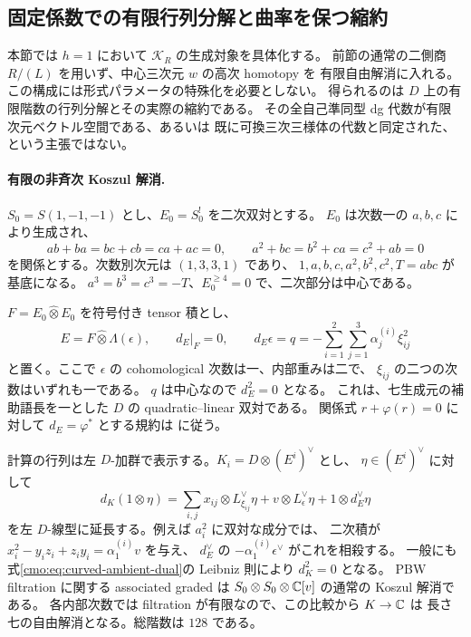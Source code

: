 \subsection{固定係数での有限行列分解と曲率を保つ縮約}
\label{cmo:subsec:curved-invariant-model}

本節では $h=1$ において $\mathcal K_R$ の生成対象を具体化する。
前節の通常の二側商 $R/(L)$ を用いず、中心三次元 $w$ の高次 homotopy を
有限自由解消に入れる。この構成には形式パラメータの特殊化を必要としない。
得られるのは $D$ 上の有限階数の行列分解とその実際の縮約である。
その全自己準同型 dg 代数が有限次元ベクトル空間である、あるいは
既に可換三次三様体の代数と同定された、という主張ではない。

\paragraph{有限の非斉次 Koszul 解消.}
$S_0=S(1,-1,-1)$ とし、$E_0=S_0^!$ を二次双対とする。
$E_0$ は次数一の $a,b,c$ により生成され、
\[
 ab+ba=bc+cb=ca+ac=0,\qquad
 a^2+bc=b^2+ca=c^2+ab=0
\]
を関係とする。次数別次元は $(1,3,3,1)$ であり、
$1,a,b,c,a^2,b^2,c^2,T=abc$ が基底になる。
$a^3=b^3=c^3=-T$、$E_0^{\ge4}=0$ で、二次部分は中心である。

$F=E_0\mathbin{\widehat\otimes}E_0$ を符号付き tensor 積とし、
\begin{equation}\label{cmo:eq:curved-ambient-dual}
 E=F\mathbin{\widehat\otimes}\Lambda(\epsilon),\qquad
 d_E|_F=0,\qquad
 d_E\epsilon=q=-\sum_{i=1}^2\sum_{j=1}^3
        \alpha_j^{(i)}\xi_{ij}^2
\end{equation}
と置く。ここで $\epsilon$ の cohomological 次数は一、内部重みは二で、
$\xi_{ij}$ の二つの次数はいずれも一である。
$q$ は中心なので $d_E^2=0$ となる。
これは、七生成元の補助語長を一とした $D$ の quadratic--linear 双対である。
関係式 $r+\varphi(r)=0$ に対して $d_E=\varphi^*$ とする規約は
\cite[\S\S2.1--2.5]{CMOPositselskiQL}に従う。

計算の行列は左 $D$-加群で表示する。$K_i=D\otimes(E^i)^\vee$ とし、
$\eta\in(E^i)^\vee$ に対して
\begin{equation}\label{cmo:eq:curved-koszul-differential}
 d_K(1\otimes\eta)=
 \sum_{i,j}x_{ij}\otimes L_{\xi_{ij}}^\vee\eta
   +v\otimes L_\epsilon^\vee\eta+1\otimes d_E^\vee\eta
\end{equation}
を左 $D$-線型に延長する。例えば $a_i^2$ に双対な成分では、
二次積が $x_i^2-y_iz_i+z_iy_i=\alpha_1^{(i)}v$ を与え、
$d_E^\vee$ の $-\alpha_1^{(i)}\epsilon^\vee$ がこれを相殺する。
一般にも式\eqref{cmo:eq:curved-ambient-dual}の Leibniz 則により $d_K^2=0$ となる。
PBW filtration に関する associated graded は
$S_0\otimes S_0\otimes\mathbb C[v]$ の通常の Koszul 解消である。
各内部次数では filtration が有限なので、この比較から $K\to\mathbb C$ は
長さ七の自由解消となる。総階数は $128$ である。

